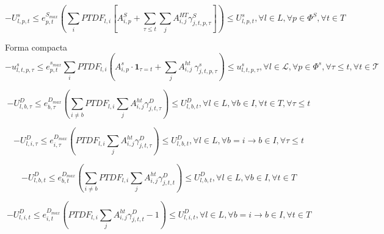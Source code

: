 \begin{equation}
-U_{l,p,t}^{s} \le e_{p,t}^{S_{max}} \left ( \sum_{i}PTDF_{l,i} \left[ A_{i,p}^S + \sum_{\tau \le t}\sum_{j}A_{i,j}^{HT}\gamma_{j,t,p,\tau}^{S} \right ] \right ) \le U_{l,p,t}^{s} , \forall l \in L, \forall p \in \Phi^{S}, \forall t \in T    
\end{equation}

Forma compacta
\begin{equation}
-u_{l,t,p,\tau}^{s} \le e_{p,t}^{s_{max}} \sum_{i}PTDF_{l,i} \left( A_{i,p}^s \cdot \mathbf{1}_{\tau = t} + \sum_{j}A_{i,j}^{ht} \: \gamma_{j,t,p,\tau}^{s} \right) \le u_{l,t,p,\tau}^{s} , \forall l \in \mathcal{L}, \forall p \in \Phi^{s}, \forall \tau \leq t, \forall t \in \mathcal{T}
\end{equation}

\begin{equation}
-U_{l,b,\tau}^{D} \le e_{b,\tau}^{D_{max}} \left ( \sum_{i\ne b}PTDF_{l,i} \sum_{j}A_{i,j}^{ht}\gamma_{j,t,\tau}^{D} \right ) \le U_{l,b,t}^{D} , \forall l \in L, \forall b \in I, \forall t \in T, \forall \tau \le t
\end{equation}

\begin{equation}
-U_{l,i,\tau}^{D} \le e_{i,\tau}^{D_{max}} \left ( PTDF_{l,i} \sum_{j}A_{i,j}^{ht}\gamma_{j,t,\tau}^{D} \right ) \le U_{l,b,t}^{D} , \forall l \in L, \forall b = i \rightarrow b\in I, \forall \tau \le t
\end{equation}

\begin{equation}
-U_{l,b,t}^{D} \le e_{b,t}^{D_{max}} \left ( \sum_{i\ne b}PTDF_{l,i} \sum_{j}A_{i,j}^{ht}\gamma_{j,t,t}^{D} \right ) \le U_{l,b,t}^{D} , \forall l \in L, \forall b \in I, \forall t \in T
\end{equation}

\begin{equation}
-U_{l,i,t}^{D} \le e_{i,t}^{D_{max}} \left ( PTDF_{l,i} \sum_{j}A_{i,j}^{ht}\gamma_{j,t,t}^{D} -1\right ) \le U_{l,i,t}^{D} , \forall l \in L, \forall b = i \rightarrow b\in I, \forall t \in T
\end{equation}
